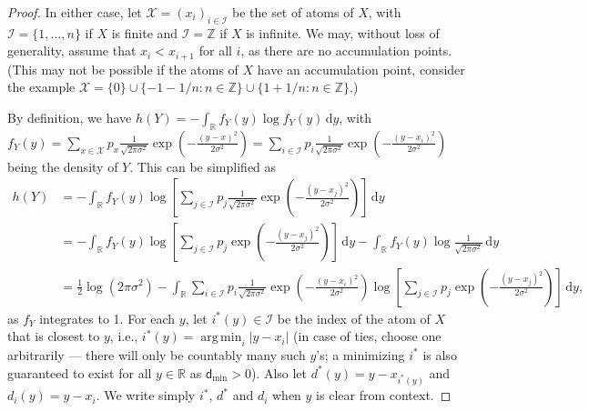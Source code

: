 \documentclass[11pt]{article}
\newcommand{\calI}{\mathcal{I}}
\newcommand{\calX}{\mathcal{X}}
\newcommand{\bbR}{\mathbb{R}}
\newcommand{\bbZ}{\mathbb{Z}}
\newcommand{\intR}{\int_{\bbR}}
\renewcommand{\d}{\,\mathrm{d}}
\newcommand{\dmin}{\mathsf{d}_{\min}}
\DeclareMathOperator*{\argmin}{arg\,min}
\begin{document}
\begin{proof}[Proof]
		In either case, let $\calX = (x_i)_{i \in \calI}$ be the set of atoms of $X$, with $\calI = \{1,\dots,n\}$ if $X$ is finite and $\calI = \bbZ$ if $X$ is infinite. We may, without loss of generality, assume that $x_i < x_{i+1}$ for all $i$, as there are no accumulation points. (This may not be possible if the atoms of $X$ have an accumulation point, consider the example $\calX = \{0\} \cup \{-1-1/n : n \in \bbZ\} \cup \{1 + 1/n : n \in \bbZ\}$.)
		
		
		
		
		By definition, we have $h(Y) = -\intR  f_Y(y) \log f_Y(y) \d y$, with $f_Y(y) = \sum_{x \in \calX} p_x  \frac{1}{\sqrt{2\pi \sigma^2}} \exp\left(-\frac{(y-x)^2}{2\sigma^2}\right) = \sum_{i \in \calI} p_i \frac{1}{\sqrt{2\pi \sigma^2}} \exp\left(-\frac{(y-x_i)^2}{2\sigma^2}\right)$ being the density of $Y$. This can be simplified as
		\begin{align*}
			h(Y) &= -\intR  f_Y(y) \log \left[\sum_{j \in \calI} p_j \tfrac{1}{\sqrt{2\pi \sigma^2}}\exp\left(-\frac{(y-x_j)^2}{2\sigma^2}\right)\right] \d y\\
			&= -\intR f_Y(y) \log \left[\sum_{j \in \calI} p_j \exp\left(-\frac{(y-x_j)^2}{2\sigma^2}\right)\right] \d y - \intR f_Y(y) \log\tfrac{1}{\sqrt{2\pi \sigma^2}}\d y\\
			&= \frac12\log(2\pi\sigma^2)-\intR \sum_{i \in \calI} p_i \tfrac{1}{\sqrt{2\pi \sigma^2}}\exp\left(-\frac{(y-x_i)^2}{2\sigma^2}\right) \log \left[\sum_{j \in \calI} p_j \exp\left(-\frac{(y-x_j)^2}{2\sigma^2}\right)\right] \d y,
		\end{align*}
		as $f_Y$ integrates to 1.  For each $y$, let $i^*(y) \in \calI$ be the index of the atom of $X$ that is closest to $y$, i.e., $i^*(y) = \argmin_i |y - x_i|$ (in case of ties, choose one arbitrarily --- there will only be countably many such $y$'s; a minimizing $i^*$ is also guaranteed to exist for all $y \in \bbR$ as $\dmin > 0$). Also let $d^*(y) = y - x_{i^*(y)}$ and $d_i(y) = y - x_i$. We write simply $i^*$, $d^*$ and $d_i$ when $y$ is clear from context. 
		

\end{proof}
\end{document}
